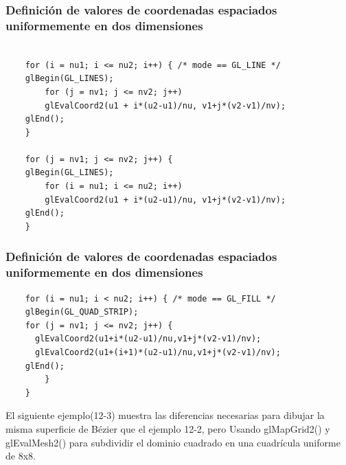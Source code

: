\documentclass[10.5pt]{beamer}
\begin{document}
\begin{frame}[fragile]
    \frametitle{Definición de valores de coordenadas espaciados uniformemente en dos dimensiones}

\begin{alertblock}{}
    \small
    \begin{verbatim}
        
    for (i = nu1; i <= nu2; i++) { /* mode == GL_LINE */
    glBegin(GL_LINES);
        for (j = nv1; j <= nv2; j++)
        glEvalCoord2(u1 + i*(u2-u1)/nu, v1+j*(v2-v1)/nv);
    glEnd();
    }

    for (j = nv1; j <= nv2; j++) {
    glBegin(GL_LINES);
        for (i = nu1; i <= nu2; i++)
        glEvalCoord2(u1 + i*(u2-u1)/nu, v1+j*(v2-v1)/nv);
    glEnd();
    }
    \end{verbatim}
\end{alertblock}
\end{frame}


\begin{frame}[fragile]
    \frametitle{Definición de valores de coordenadas espaciados uniformemente en dos dimensiones}

\begin{alertblock}{}
    \small
    \begin{verbatim}
    for (i = nu1; i < nu2; i++) { /* mode == GL_FILL */
    glBegin(GL_QUAD_STRIP);
    for (j = nv1; j <= nv2; j++) {
      glEvalCoord2(u1+i*(u2-u1)/nu,v1+j*(v2-v1)/nv);
      glEvalCoord2(u1+(i+1)*(u2-u1)/nu,v1+j*(v2-v1)/nv);
    glEnd();
        }
    }
\end{verbatim}
\end{alertblock}

El siguiente ejemplo(12-3) muestra las diferencias necesarias para dibujar la misma superficie de Bézier que el ejemplo 12-2, pero
Usando glMapGrid2() y glEvalMesh2() para subdividir el dominio cuadrado en una cuadrícula uniforme de 8x8.

\end{frame}
\end{document}
